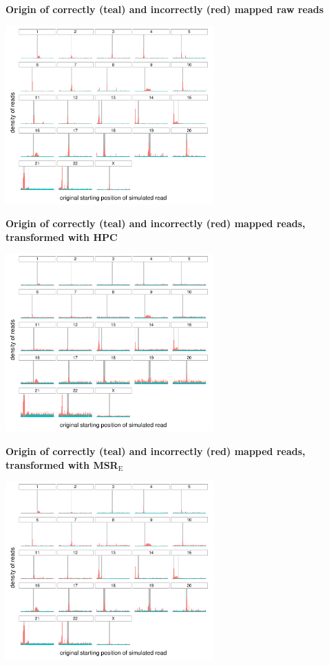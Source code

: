 \documentclass[
  11,
]{scrbook}
\begin{document}
\textbf{Origin of correctly (teal) and incorrectly (red) mapped raw reads}

\begin{center}
\includegraphics[width=0.6\textwidth]{./figures/HPC-MSRs/hpc_distrib.centro.pdf}  
\end{center}

\textbf{Origin of correctly (teal) and incorrectly (red) mapped reads,
transformed with HPC}

\begin{center}
\includegraphics[width=0.6\textwidth]{./figures/HPC-MSRs/msr_e_distrib.centro.pdf}  
\end{center}

\textbf{Origin of correctly (teal) and incorrectly (red) mapped reads,
transformed with MSR\(_{\text{E}}\)}

\begin{center}
\includegraphics[width=0.6\textwidth]{./figures/HPC-MSRs/msr_p_distrib.centro.pdf}  
\end{center}
\end{document}
